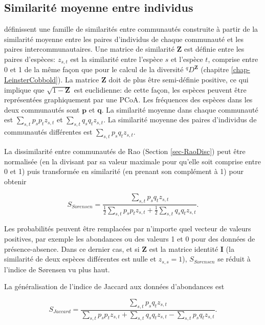 \documentclass[
  11pt,
  french,
  a4paper,
  extrafontsizes,onecolumn,openright
  ]{memoir}
\begin{document}
\hypertarget{similarituxe9-moyenne-entre-individus}{%
\subsection{Similarité moyenne entre individus}\label{similarituxe9-moyenne-entre-individus}}

\textcite{Pavoine2014b} définissent une famille de similarités entre communautés construite à partir de la similarité moyenne entre les paires d'individus de chaque communauté et les paires intercommunautaires.
Une matrice de similarité \(\mathbf{Z}\) est définie entre les paires d'espèces: \(z_{s,t}\) est la similarité entre l'espèce \(s\) et l'espèce \(t\), comprise entre 0 et 1 de la même façon que pour le calcul de la diversité \(^q\!D^{\mathbf{Z}}\) (chapitre \ref{chap-LeinsterCobbold}).
La matrice \(\mathbf{Z}\) doit de plus être semi-définie positive, ce qui implique que \(\sqrt{1-\mathbf{Z}}\) est euclidienne: de cette façon, les espèces peuvent être représentées graphiquement par une PCoA.
Les fréquences des espèces dans les deux communautés sont \(\mathbf{p}\) et \(\mathbf{q}\).
La similarité moyenne dans chaque communauté est \(\sum_{s,t}{p_s p_t z_{s,t}}\) et \(\sum_{s,t}{q_s q_t z_{s,t}}\).
La similarité moyenne des paires d'individus de communautés différentes est \(\sum_{s,t}{p_s q_t z_{s,t}}\).

La dissimilarité entre communautés de Rao (Section \ref{sec-RaoDisc}) peut être normalisée (en la divisant par sa valeur maximale pour qu'elle soit comprise entre 0 et 1) puis transformée en similarité (en prenant son complément à 1) pour obtenir

\begin{equation}
  \label{eq:SorensenAbd}
  S_{\mathit{Sorensen}} = \frac{\sum_{s,t}{p_s q_t z_{s,t}}}{\frac{1}{2}\sum_{s,t}{p_s p_t z_{s,t}} + \frac{1}{2}\sum_{s,t}{q_s q_t z_{s,t}}}.
\end{equation}

Les probabilités peuvent être remplacées par n'importe quel vecteur de valeurs positives, par exemple les abondances ou des valeurs 1 et 0 pour des données de présence-absence.
Dans ce dernier cas, et si \(\mathbf{Z}\) est la matrice identité \(\mathbf{I}\) (la similarité de deux espèces différentes est nulle et \(z_{s,s}=1\)), \(S_{\mathit{Sorensen}}\) se réduit à l'indice de Sørensen vu plus haut.

La généralisation de l'indice de Jaccard aux données d'abondances est

\begin{equation}
  \label{eq:JaccardAbd}
  S_{\mathit{Jaccard}} = \frac{\sum_{s,t}{p_s q_t z_{s,t}}}{\sum_{s,t}{p_s p_t z_{s,t}} + \sum_{s,t}{q_s q_t z_{s,t}} - \sum_{s,t}{p_s q_t z_{s,t}}}.
\end{equation}
\end{document}
